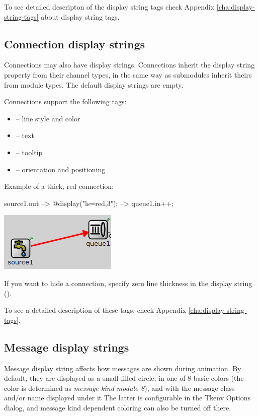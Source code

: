 To see detailed descripton of the display string tags check
Appendix \ref{cha:display-string-tags} about display string tags.

\subsection{Connection display strings}

Connections may also have display strings. Connections inherit the
display string property from their channel types, in the same way as 
submodules inherit theirs from module types. The default display
strings are empty.

Connections support the following tags:
\begin{itemize}
  \item{ -- line style and color}
  \item{ -- text}
  \item{ -- tooltip}
  \item{ -- orientation and positioning}
\end{itemize}

Example of a thick, red connection:
\begin{ned}
source1.out --> { @display("ls=red,3"); } --> queue1.in++;
\end{ned}

\begin{center}
\includegraphics{figures/graphics-lstag}
\end{center}

\begin{note}
If you want to hide a connection, specify zero line thickness in the display 
string ().
\end{note}

To see a detailed description of these tags, check Appendix 
\ref{cha:display-string-tags}.

\subsection{Message display strings}

Message display string affects how messages are shown during animation.
By default, they are displayed as a small filled circle, in one of
8 basic colors (the color is determined as \textit{message kind modulo 8}),
and with the message class and/or name displayed under it
The latter is configurable in the Tkenv Options dialog, and message kind
dependent coloring can also be turned off there.

